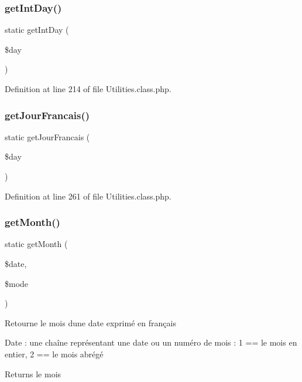 \subsubsection{\texorpdfstring{get\+Int\+Day()}{getIntDay()}}
{\footnotesize\ttfamily static get\+Int\+Day (\begin{DoxyParamCaption}\item[{}]{\$day }\end{DoxyParamCaption})\hspace{0.3cm}{\ttfamily [static]}}



Definition at line 214 of file Utilities.\+class.\+php.

\mbox{\label{class_utilities_ab9b0bb93c5d3f205617398e33c1d1ea4}} 
\subsubsection{\texorpdfstring{get\+Jour\+Francais()}{getJourFrancais()}}
{\footnotesize\ttfamily static get\+Jour\+Francais (\begin{DoxyParamCaption}\item[{}]{\$day }\end{DoxyParamCaption})\hspace{0.3cm}{\ttfamily [static]}}



Definition at line 261 of file Utilities.\+class.\+php.

\mbox{\label{class_utilities_ae2079f81b1e43b78deddc4bb77cb6c68}} 
\subsubsection{\texorpdfstring{get\+Month()}{getMonth()}}
{\footnotesize\ttfamily static get\+Month (\begin{DoxyParamCaption}\item[{}]{\$date,  }\item[{}]{\$mode }\end{DoxyParamCaption})\hspace{0.3cm}{\ttfamily [static]}}

Retourne le mois d\textquotesingle{}une date exprimé en français \begin{DoxyDate}{Date}
\+: une chaîne représentant une date ou un numéro de mois  \+: 1 == le mois en entier, 2 == le mois abrégé 
\end{DoxyDate}
\begin{DoxyReturn}{Returns}
le mois 
\end{DoxyReturn}


